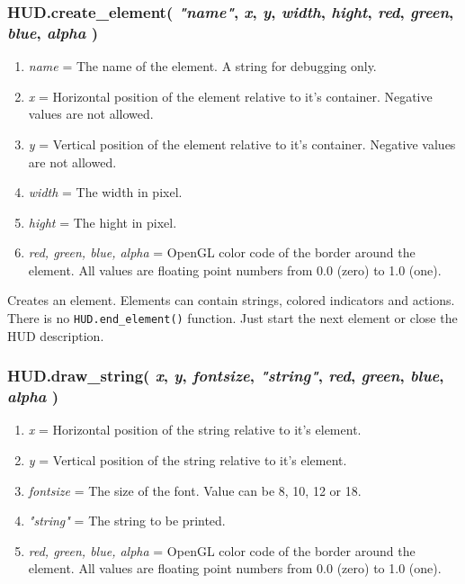 \documentclass[11pt,parskip=half,a4paper]{scrartcl}
\begin{document}
\subsubsection{HUD.create\_element(  \emph{"name"}, \emph{x}, \emph{y}, \emph{width}, \emph{hight}, \emph{red}, \emph{green}, \emph{blue}, \emph{alpha} )}

\begin{enumerate}
	\item \emph{name} = The name of the element. A string for debugging only.
	\item \emph{x} = Horizontal position of the element relative to it's container. Negative values are not allowed.
	\item \emph{y} = Vertical position of the element relative to it's container. Negative values are not allowed.
	\item \emph{width} = The width in pixel.
	\item \emph{hight} = The hight in pixel.
	\item \emph{red, green, blue, alpha} = OpenGL color code of the border around the element. All values are floating point numbers from 0.0 (zero) to 1.0 (one).
\end{enumerate}

Creates an element. Elements can contain strings, colored indicators and actions. There is no \verb|HUD.end_element()| function. Just start the next element or close the HUD description.

\subsubsection{HUD.draw\_string( \emph{x}, \emph{y}, \emph{fontsize}, \emph{"string"}, \emph{red}, \emph{green}, \emph{blue}, \emph{alpha} )}

\begin{enumerate}
	\item \emph{x} = Horizontal position of the string relative to it's element.
	\item \emph{y} = Vertical position of the string relative to it's element.
	\item \emph{fontsize} = The size of the font. Value can be 8, 10, 12 or 18.
	\item \emph{"string"} = The string to be printed.
	\item \emph{red, green, blue, alpha} = OpenGL color code of the border around the element. All values are floating point numbers from 0.0 (zero) to 1.0 (one).
\end{enumerate}
\end{document}
